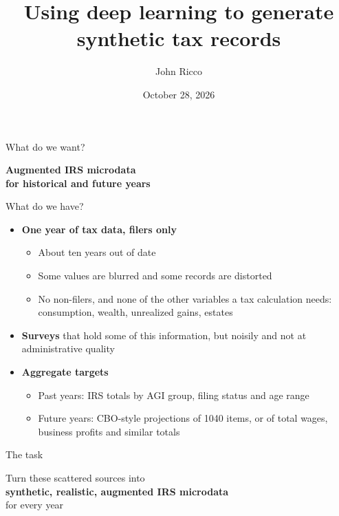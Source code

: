 \documentclass[11pt,aspectratio=169]{beamer}
\title{Using deep learning to generate synthetic tax records}
\author{John Ricco}
\institute{The Budget Lab at Yale}
\date{October 28, 2026}
\begin{document}
\begin{frame}
  \titlepage
\end{frame}


\begin{frame}{What do we want?}
  \vfill
  \begin{center}
    {\LARGE\bfseries\color{yaleblue} Augmented IRS microdata\\[0.3em] for historical and future years}
  \end{center}
  \vfill
\end{frame}

\begin{frame}{What do we have?}
  \begin{itemize}
    \item \textbf{One year of tax data, filers only}
    \begin{itemize}
      \item About ten years out of date
      \item Some values are blurred and some records are distorted
      \item No non-filers, and none of the other variables a tax calculation needs:
            consumption, wealth, unrealized gains, estates
    \end{itemize}
    \vspace{0.5em}
    \item \textbf{Surveys} that hold some of this information, but noisily and not
          at administrative quality
    \vspace{0.5em}
    \item \textbf{Aggregate targets}
    \begin{itemize}
      \item Past years: IRS totals by AGI group, filing status and age range
      \item Future years: CBO-style projections of 1040 items, or of total wages,
            business profits and similar totals
    \end{itemize}
  \end{itemize}
\end{frame}

\begin{frame}{The task}
  \vfill
  \begin{center}
    {\Large Turn these scattered sources into\\[0.4em]
    {\bfseries\color{yaleblue} synthetic, realistic, augmented IRS microdata}\\[0.4em]
    for every year}
  \end{center}
  \vfill
\end{frame}
\end{document}
